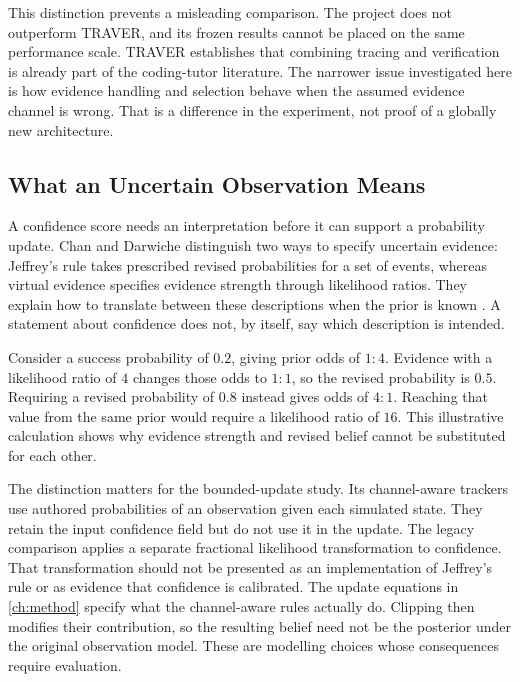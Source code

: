 This distinction prevents a misleading comparison. The project does not outperform TRAVER, and its frozen results cannot be
placed on the same performance scale. TRAVER establishes that combining tracing and verification is already part of the
coding-tutor literature. The narrower issue investigated here is how evidence handling and selection behave when the assumed
evidence channel is wrong. That is a difference in the experiment, not proof of a globally new architecture.

\subsection{What an Uncertain Observation Means}

A confidence score needs an interpretation before it can support a probability update. Chan and Darwiche distinguish two
ways to specify uncertain evidence: Jeffrey's rule takes prescribed revised probabilities for a set of events, whereas virtual evidence
specifies evidence strength through likelihood ratios. They explain how to translate between these descriptions when the
prior is known \parencite[pp. 69--74, 77--78]{chan2003uncertain}. A statement about confidence does not, by itself, say which
description is intended.

Consider a success probability of $0.2$, giving prior odds of $1:4$. Evidence with a likelihood ratio of $4$ changes those
odds to $1:1$, so the revised probability is $0.5$. Requiring a revised probability of $0.8$ instead gives odds of $4:1$.
Reaching that value from the same prior would require a likelihood ratio of $16$. This illustrative calculation shows why
evidence strength and revised belief cannot be substituted for each other.

The distinction matters for the bounded-update study. Its channel-aware trackers use authored probabilities of an observation given each simulated
state. They retain the input confidence field but do not use it in the update. The legacy comparison applies a separate
fractional likelihood transformation to confidence. That transformation should not be presented as an implementation of
Jeffrey's rule or as evidence that confidence is calibrated. The update equations in \cref{ch:method} specify what the
channel-aware rules actually do. Clipping then modifies their contribution, so the resulting belief need not be the posterior
under the original observation model. These are modelling choices whose consequences require evaluation.


